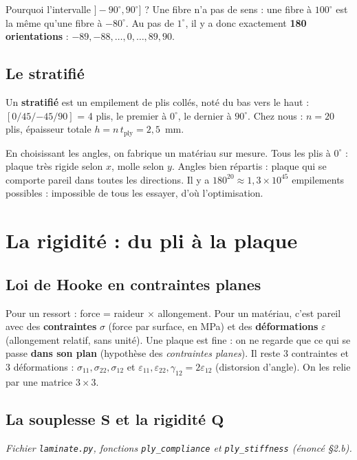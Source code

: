 \documentclass[11pt,a4paper]{article}
\newcommand{\Q}{\mathbf{Q}}
\newcommand{\Sm}{\mathbf{S}}
\newcommand{\code}[1]{\texttt{#1}}
\begin{document}
Pourquoi l'intervalle $]-90^\circ, 90^\circ]$ ? Une fibre n'a pas de sens :
une fibre à $100^\circ$ est la même qu'une fibre à $-80^\circ$. Au pas de
$1^\circ$, il y a donc exactement \textbf{180 orientations} :
$-89, -88, \dots, 0, \dots, 89, 90$.

\subsection{Le stratifié}
Un \textbf{stratifié} est un empilement de plis collés, noté du bas vers le
haut : $[0/45/{-45}/90]$ = 4 plis, le premier à $0^\circ$, le dernier à
$90^\circ$. Chez nous : $n = 20$ plis, épaisseur totale
$h = n\,t_{\text{ply}} = 2{,}5$~mm.

\begin{idee}
En choisissant les angles, on \og fabrique\fg{} un matériau sur mesure. Tous
les plis à $0^\circ$ : plaque très rigide selon $x$, molle selon $y$. Angles
bien répartis : plaque qui se comporte pareil dans toutes les directions.
Il y a $180^{20} \approx 1{,}3\times10^{45}$ empilements possibles :
impossible de tous les essayer, d'où l'optimisation.
\end{idee}

\section{La rigidité : du pli à la plaque}
\subsection{Loi de Hooke en contraintes planes}
Pour un ressort : force = raideur $\times$ allongement. Pour un matériau,
c'est pareil avec des \textbf{contraintes} $\sigma$ (force par surface, en
MPa) et des \textbf{déformations} $\varepsilon$ (allongement relatif, sans
unité). Une plaque est fine : on ne regarde que ce qui se passe \textbf{dans
son plan} (hypothèse des \emph{contraintes planes}). Il reste 3 contraintes
et 3 déformations : $\sigma_{11}, \sigma_{22}, \sigma_{12}$ et
$\varepsilon_{11}, \varepsilon_{22}, \gamma_{12} = 2\varepsilon_{12}$
(distorsion d'angle). On les relie par une matrice $3\times3$.

\subsection{La souplesse \texorpdfstring{$\Sm$}{S} et la rigidité \texorpdfstring{$\Q$}{Q}}
\emph{Fichier \code{laminate.py}, fonctions \code{ply\_compliance} et
\code{ply\_stiffness} (énoncé §2.b).}
\end{document}
